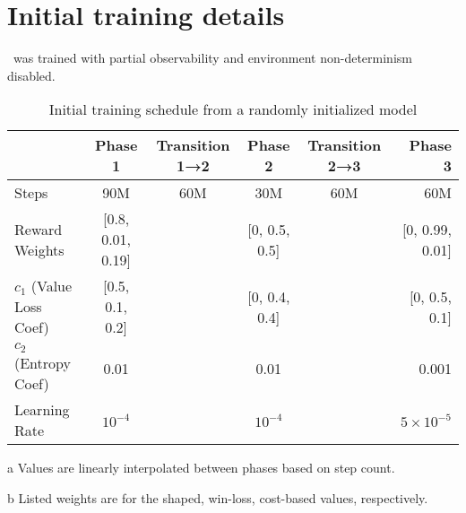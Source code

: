 \documentclass[conference,onecolumn]{IEEEtran}
\newcounter{supptable}
\newenvironment{supptable}
  {\renewcommand{\tablename}{Supplemental Table}\setcounter{table}{\value{supptable}}\addtocounter{supptable}{1}\begin{table}}
  {\end{table}\setcounter{supptable}{\value{table}}}
\begin{document}
\section{Initial training details}
\label{appendix:initial-training-details}
\agentName\ was trained with partial observability and environment non-determinism disabled.

\begin{supptable}[H]
    \centering
    \begin{threeparttable}
    \caption{Initial training schedule from a randomly initialized model}
    \label{tab:initial-training-schedule}
    \begin{tabular}{lccccr}
    \toprule
     & Phase 1 & Transition 1→2\tnote{a} & Phase 2 & Transition 2→3\tnote{a} & Phase 3 \\
    \midrule
    Steps & 90M & 60M & 30M & 60M & 60M \\
    Reward Weights\tnote{b} & [0.8, 0.01, 0.19] &  & [0, 0.5, 0.5] &  & [0, 0.99, 0.01] \\
    $c_1$ (Value Loss Coef)\tnote{b} & [0.5, 0.1, 0.2] &  & [0, 0.4, 0.4] &  & [0, 0.5, 0.1]\\
    $c_2$ (Entropy Coef)& 0.01 & & 0.01 & & 0.001 \\
    Learning Rate & $10^{-4}$ & & $10^{-4}$ & & $5 \times 10^{-5}$\\
    \bottomrule
    \end{tabular}
    \begin{tablenotes}
       \item[a] Values are linearly interpolated between phases based on step count.
       \item[b] Listed weights are for the shaped, win-loss, cost-based values, respectively.
    \end{tablenotes}
    \end{threeparttable}
\end{supptable}
\end{document}

